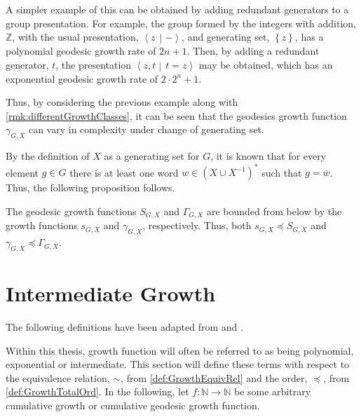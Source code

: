 \begin{example}
	A simpler example of this can be obtained by adding redundant generators to a group presentation. For example, the group formed by the integers with addition, $\mathbb{Z}$, with the usual presentation, $\left\langle z \, \middle\vert - \right\rangle$, and generating set, $\left\lbrace z \right\rbrace$, has a polynomial geodesic growth rate of $2n+1$.
	Then, by adding a redundant generator, $t$, the presentation $\left\langle z,t \middle\vert \, t = z  \right\rangle$ may be obtained, which has an exponential geodesic growth rate of $2 \cdot 2^n + 1$.
\end{example}

\begin{remark}
	Thus, by considering the previous example along with \cref{rmk:differentGrowthClasses}, it can be seen that the geodesics growth function $\gamma_{G,X}$ can vary in complexity under change of generating set.
	\thmendmark
\end{remark}

By the definition of $X$ as a generating set for $G$, it is known that for every element $g \in G$ there is at least one word $w \in \left( X \cup X^{-1} \right)^\ast$ such that $g = \overline{w}$.
Thus, the following proposition follows.

\begin{proposition}
	\label{prop:growth-function-bounds}
	The geodesic growth functions $S_{G,X}$ and $\Gamma_{G,X}$ are bounded from below by the growth functions $s_{G,X}$ and $\gamma_{G,X}$, respectively.
	Thus, both $s_{G,X} \preccurlyeq S_{G,X}$ and $\gamma_{G,X} \preccurlyeq \Gamma_{G,X}$.
\end{proposition}

\section{Intermediate Growth}
\label{sec:interGrowth}

The following definitions have been adapted from \cite{GrigPak} and \cite{HowGroupsGrow}.

Within this thesis, growth function will often be referred to as being polynomial, exponential or intermediate.
This section will define these terms with respect to the equivalence relation, $\sim$, from \cref{def:GrowthEquivRel} and the order, $\preccurlyeq$, from \cref{def:GrowthTotalOrd}.
In the following, let $f : \mathbb{N} \to \mathbb{N}$ be some arbitrary cumulative growth or cumulative geodesic growth function.

